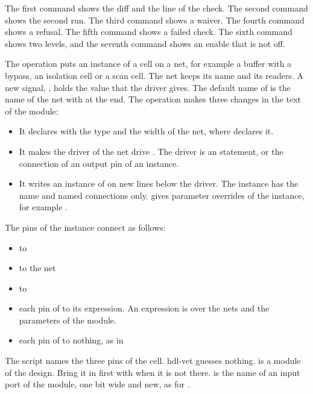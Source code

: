 The first command shows the diff and the line of the check. The second command shows the
second run. The third command shows a waiver. The fourth command shows a refusal. The fifth
command shows a failed check. The sixth command shows two levels, and the seventh command
shows an enable that is not off.

\begin{entry}{}
\item[Writes] The operation puts an instance of a cell on a net, for example a buffer with a
  bypass, an isolation cell or a scan cell. The net keeps its name and its readers. A new
  signal, , holds the value that the driver gives. The default name of 
  is the name of the net with  at the end. The operation makes three changes in
  the text of the module:
  \begin{itemize}
  \item It declares  with the type and the width of the net, where
     declares it.
  \item It makes the driver of the net drive . The driver is an 
    statement, or the connection of an output pin of an instance.
  \item It writes an instance of  on new lines below the driver. The instance
    has the name  and named connections only.  gives parameter
    overrides of the instance, for example .
  \end{itemize}
  The pins of the instance connect as follows:
  \begin{itemize}
  \item {} to 
  \item {} to the net
  \item {} to 
  \item each pin of  to its expression. An expression is over the nets and
    the parameters of the module.
  \item each pin of  to nothing, as in 
  \end{itemize}
  The script names the three pins of the cell. hdl-vet guesses nothing.  is a
  module of the design. Bring it in first with  when it is not there.
   is the name of an input port of the module, one bit wide and new, as for
  .


\end{entry}
